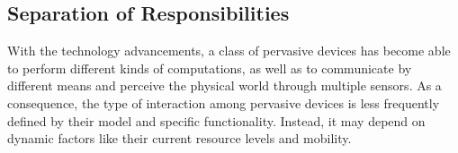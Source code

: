








\subsection{Separation of Responsibilities}



With the technology advancements, a class of pervasive devices has become able to perform different kinds of computations, as well as to communicate by different means and perceive the physical world through multiple sensors. As a consequence, the type of interaction among pervasive devices is less frequently defined by their model and specific functionality. Instead, it may depend on dynamic factors like their current resource levels and mobility.


